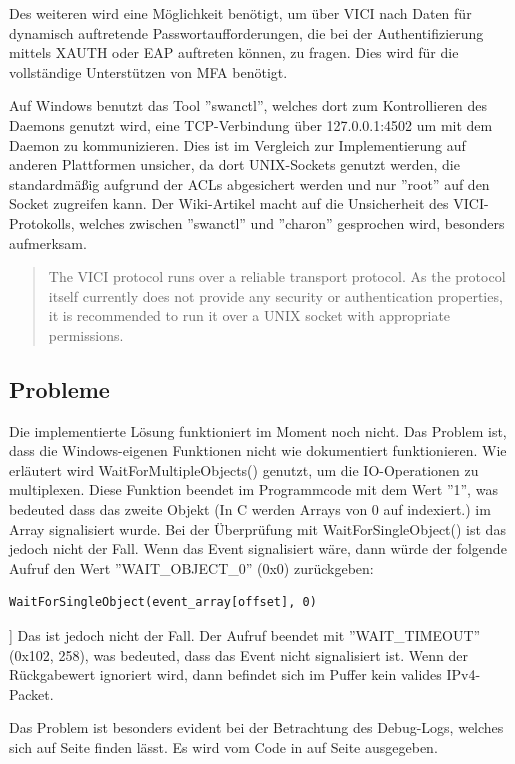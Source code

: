 Des weiteren wird eine Möglichkeit benötigt, um über \ac{VICI} nach Daten für dynamisch auftretende
Passwortaufforderungen, die bei der Authentifizierung mittels XAUTH oder EAP auftreten können,
zu fragen. Dies wird für die vollständige Unterstützen von \ac{MFA} benötigt.

Auf Windows benutzt das Tool ''swanctl'', welches dort zum Kontrollieren des Daemons
genutzt wird, eine TCP-Verbindung über 127.0.0.1:4502 um mit dem Daemon zu kommunizieren.
Dies ist im Vergleich zur Implementierung auf anderen Plattformen unsicher, da dort
UNIX-Sockets genutzt werden, die standardmäßig aufgrund der \acp{ACL} abgesichert werden
und nur ''root'' auf den Socket zugreifen kann. Der Wiki-Artikel macht auf die Unsicherheit
des \ac{VICI}-Protokolls, welches zwischen ''swanctl'' und ''charon'' gesprochen wird, besonders aufmerksam.
\begin{quote}
The VICI protocol runs over a reliable transport protocol. As the protocol itself currently does not provide any security or authentication properties, it is recommended to run it over a UNIX socket with appropriate permissions.
\end{quote}\cite[][]{_vici_2016}

\subsection{Probleme}
Die implementierte Lösung funktioniert im Moment noch nicht. Das Problem ist, dass
die Windows-eigenen Funktionen nicht wie dokumentiert funktionieren.
Wie erläutert wird WaitForMultipleObjects() genutzt, um die IO-Operationen
zu multiplexen. Diese Funktion beendet im Programmcode mit dem Wert ''1'',
was bedeuted dass das zweite Objekt (In C werden Arrays von 0 auf indexiert.)
im Array signalisiert wurde. Bei der Überprüfung mit WaitForSingleObject() ist das jedoch nicht
der Fall. Wenn das Event signalisiert wäre, dann würde der folgende Aufruf
den Wert ''WAIT\_OBJECT\_0'' (0x0) zurückgeben:
\begin{lstlisting}
WaitForSingleObject(event_array[offset], 0)
\end{lstlisting}]
Das ist jedoch nicht der Fall. Der Aufruf beendet mit ''WAIT\_TIMEOUT'' (0x102, 258),
was bedeuted, dass das Event nicht signalisiert ist. Wenn der Rückgabewert
ignoriert wird, dann befindet sich im Puffer kein valides IPv4-Packet.

Das Problem ist besonders evident bei der Betrachtung des Debug-Logs,
welches sich auf Seite \pageref{lst:debug-log} finden lässt.
Es wird vom Code in auf Seite \pageref{lst:handle-plain-windows} ausgegeben.

